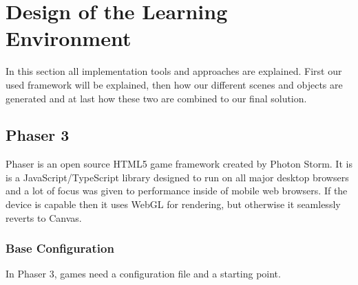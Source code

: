 
\chapter{Design of the Learning Environment}
\label{chap:design}

In this section all implementation tools and approaches are explained.
First our used framework will be explained, then how our different scenes and objects are generated and
at last how these two are combined to our final solution.

\section{Phaser 3}\label{sec:phaser-3}

Phaser is an open source HTML5 game framework created by Photon Storm.
It is is a JavaScript/TypeScript library designed to run on all major desktop browsers and
a lot of focus was given to performance inside of mobile web browsers.
If the device is capable then it uses WebGL for rendering, but otherwise it seamlessly reverts to Canvas.

\subsection{Base Configuration}\label{subsec:base-configuration}
In Phaser 3, games need a configuration file and a starting point.

